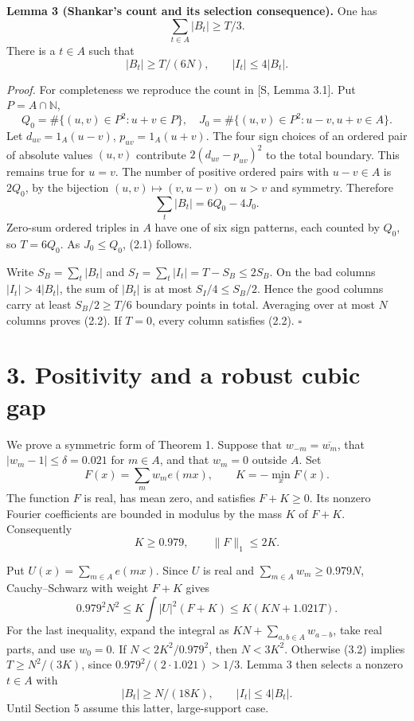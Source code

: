 \documentclass[11pt]{article}
\begin{document}
\textbf{Lemma 3 (Shankar's count and its selection consequence).} One has
\[
\sum_{t\in A}|B_t|\geq T/3.
\tag{2.1}
\]
There is a \(t\in A\) such that
\[
|B_t|\geq T/(6N),\qquad |I_t|\leq4|B_t|.
\tag{2.2}
\]

\emph{Proof.} For completeness we reproduce the count in [S, Lemma 3.1]. Put \(P=A\cap\mathbb N\),
\[
Q_0=\#\{(u,v)\in P^2:u+v\in P\},\quad
J_0=\#\{(u,v)\in P^2:u-v,u+v\in A\}.
\]
Let \(d_{uv}=1_A(u-v)\), \(p_{uv}=1_A(u+v)\). The four sign choices of an ordered pair of absolute values \((u,v)\) contribute \(2(d_{uv}-p_{uv})^2\) to the total boundary. This remains true for \(u=v\). The number of positive ordered pairs with \(u-v\in A\) is \(2Q_0\), by the bijection \((u,v)\mapsto(v,u-v)\) on \(u>v\) and symmetry. Therefore
\[
\sum_t|B_t|=6Q_0-4J_0.
\]
Zero-sum ordered triples in \(A\) have one of six sign patterns, each counted by \(Q_0\), so \(T=6Q_0\). As \(J_0\leq Q_0\), (2.1) follows.

Write \(S_B=\sum_t|B_t|\) and \(S_I=\sum_t|I_t|=T-S_B\leq2S_B\). On the bad columns \(|I_t|>4|B_t|\), the sum of \(|B_t|\) is at most \(S_I/4\leq S_B/2\). Hence the good columns carry at least \(S_B/2\geq T/6\) boundary points in total. Averaging over at most \(N\) columns proves (2.2). If \(T=0\), every column satisfies (2.2). \(\square\)

\section*{3. Positivity and a robust cubic gap}

We prove a symmetric form of Theorem 1. Suppose that \(w_{-m}=\overline{w_m}\), that \(|w_m-1|\leq\delta=0.021\) for \(m\in A\), and that \(w_m=0\) outside \(A\). Set
\[
F(x)=\sum_m w_m e(mx),\qquad K=-\min_xF(x).
\]
The function \(F\) is real, has mean zero, and satisfies \(F+K\geq0\). Its nonzero Fourier coefficients are bounded in modulus by the mass \(K\) of \(F+K\). Consequently
\[
K\geq0.979,\qquad \|F\|_1\leq2K.
\tag{3.1}
\]

Put \(U(x)=\sum_{m\in A}e(mx)\). Since \(U\) is real and \(\sum_{m\in A}w_m\geq0.979N\), Cauchy--Schwarz with weight \(F+K\) gives
\[
0.979^2N^2\leq K\int |U|^2(F+K)
\leq K(KN+1.021T).
\tag{3.2}
\]
For the last inequality, expand the integral as \(KN+\sum_{a,b\in A}w_{a-b}\), take real parts, and use \(w_0=0\). If \(N<2K^2/0.979^2\), then \(N<3K^2\). Otherwise (3.2) implies \(T\geq N^2/(3K)\), since \(0.979^2/(2\cdot1.021)>1/3\). Lemma 3 then selects a nonzero \(t\in A\) with
\[
|B_t|\geq N/(18K),\qquad |I_t|\leq4|B_t|.
\tag{3.3}
\]
Until Section 5 assume this latter, large-support case.
\end{document}
